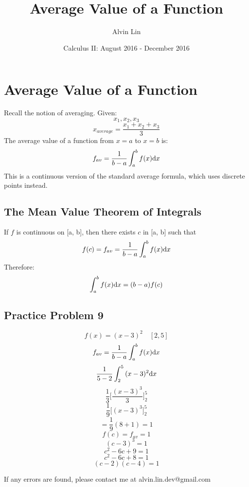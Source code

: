 \documentclass[letterpaper, 12pt]{math}
\title{Average Value of a Function}
\author{Alvin Lin}
\date{Calculus II: August 2016 - December 2016}
\begin{document}
\maketitle

\section*{Average Value of a Function}
Recall the notion of averaging. Given:
\[ x_{1}, x_{2}, x_{3} \]
\[ x_{average} = \frac{x_{1}+x_{2}+x_{3}}{3} \]
The average value of a function from \( x = a \) to \( x = b \) is:
\[ f_{av} = \frac{1}{b-a}\int_{a}^{b}{f(x)\mathrm{d}{x}} \]
This is a continuous version of the standard average formula, which uses
discrete points instead.

\subsection*{The Mean Value Theorem of Integrals}
If \( f \) is continuous on [a, b], then there exists \( c \) in [a, b] such
that
\[ f(c) = f_{av} = \frac{1}{b-a}\int_{a}^{b}{f(x)\mathrm{d}{x}} \]
Therefore:
\[ \int_{a}^{b}{f(x)\mathrm{d}{x}} = (b-a)f(c) \]

\subsection*{Practice Problem 9}
\[ f(x) = (x-3)^{2} \quad [2, 5] \]
\[ f_{av} = \frac{1}{b-a}\int_{a}^{b}{f(x)\mathrm{d}{x}} \]
\[ \frac{1}{5-2}\int_{2}^{5}{(x-3)^{2}\mathrm{d}{x}} \]
\[ \frac{1}{3}\bigg[\frac{(x-3)^{3}}{3}\bigg]_{2}^{5} \]
\[ \frac{1}{9}\bigg[(x-3)^{3}]_{2}^{5} \]
\[ = \frac{1}{9}(8+1) = 1 \]
\[ f(c) = f_{av} = 1 \]
\[ (c-3)^{3} = 1 \]
\[ c^{2}-6c+9 = 1 \]
\[ c^{2}-6c+8 = 1 \]
\[ (c-2)(c-4) = 1 \]

\begin{center}
  If any errors are found, please contact me at alvin.lin.dev@gmail.com
\end{center}
\end{document}
